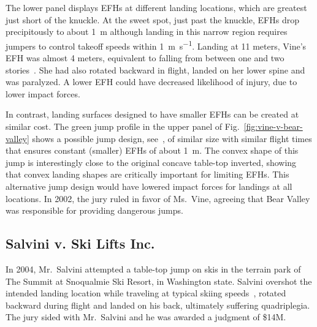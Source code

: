 \documentclass[smallextended]{svjour3}       %
\begin{document}
The lower panel displays EFHs at different landing locations, which are greatest
just short of the knuckle.  At the sweet spot, just past the knuckle, EFHs
drop precipitously to  about 1~\si{\meter} although landing in this narrow region
requires jumpers to control takeoff speeds within 1~\si{\meter\per\second}.
Landing at 11 meters, Vine's EFH was almost 4 meters, equivalent to falling
from between one and two stories~\cite{Vish2005}. She had also rotated backward
in flight, landed on her lower spine and was paralyzed. A lower EFH could have
decreased likelihood of injury, due to lower impact forces.

In contrast, landing surfaces designed to have smaller EFHs can be created at
similar cost. The green jump profile in the upper panel of
Fig.~\ref{fig:vine-v-bear-valley} shows a possible jump design,
see~\cite{Levy2015}, of similar size with similar flight times that ensures
constant (smaller) EFHs of about 1~\si{\meter}. The convex shape of this jump is
interestingly close to the original concave table-top  inverted, showing that
convex landing shapes are critically important for limiting EFHs. This
alternative jump design would have lowered impact forces for landings at all
locations. In 2002, the jury ruled in favor of Ms.~Vine, agreeing that Bear
Valley was responsible for providing dangerous jumps.

\subsection{Salvini v. Ski Lifts Inc.}
\label{sec:salvini}
%
In 2004, Mr.~Salvini attempted a table-top jump on skis in the terrain park of
The Summit at Snoqualmie Ski Resort, in Washington state. Salvini overshot the
intended landing location while traveling at typical skiing speeds~\cite{Shealy2005}, rotated
backward during flight and landed on his back, ultimately suffering
quadriplegia. The jury sided with Mr.~Salvini and he was awarded a judgment of \$14M.
\end{document}
